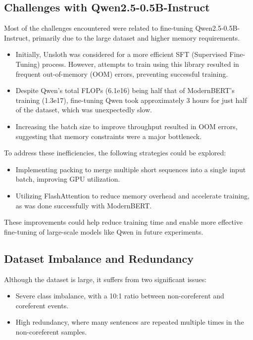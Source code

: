 \documentclass[12pt,a4paper]{article}
\begin{document}
\subsection{Challenges with Qwen2.5-0.5B-Instruct}

Most of the challenges encountered were related to fine-tuning Qwen2.5-0.5B-Instruct, primarily due to the large dataset and higher memory requirements.

\begin{itemize}
    \item Initially, Unsloth was considered for a more efficient SFT (Supervised Fine-Tuning) process. However, attempts to train using this library resulted in frequent out-of-memory (OOM) errors, preventing successful training.
    \item Despite Qwen’s total FLOPs (6.1e16) being half that of ModernBERT’s training (1.3e17), fine-tuning Qwen took approximately 3 hours for just half of the dataset, which was unexpectedly slow.
    \item Increasing the batch size to improve throughput resulted in OOM errors, suggesting that memory constraints were a major bottleneck.
\end{itemize}

To address these inefficiencies, the following strategies could be explored:

\begin{itemize}
    \item Implementing packing to merge multiple short sequences into a single input batch, improving GPU utilization.
    \item Utilizing FlashAttention to reduce memory overhead and accelerate training, as was done successfully with ModernBERT.
\end{itemize}

These improvements could help reduce training time and enable more effective fine-tuning of large-scale models like Qwen in future experiments.

\subsection{Dataset Imbalance and Redundancy}

Although the dataset is large, it suffers from two significant issues:
\begin{itemize}
    \item Severe class imbalance, with a 10:1 ratio between non-coreferent and coreferent events.
    \item High redundancy, where many sentences are repeated multiple times in the non-coreferent samples.
\end{itemize}
\end{document}
